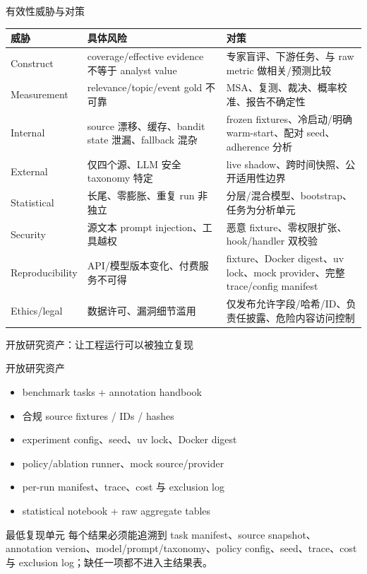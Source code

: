 \begin{frame}{有效性威胁与对策}
\scriptsize
\begin{tabularx}{\textwidth}{p{} X X}
\toprule
威胁 & 具体风险 & 对策 \\
\midrule
Construct & coverage/effective evidence 不等于 analyst value & 专家盲评、下游任务、与 raw metric 做相关/预测比较 \\
Measurement & relevance/topic/event gold 不可靠 & MSA、复测、裁决、概率校准、报告不确定性 \\
Internal & source 漂移、缓存、bandit state 泄漏、fallback 混杂 & frozen fixtures、冷启动/明确 warm-start、配对 seed、adherence 分析 \\
External & 仅四个源、LLM 安全 taxonomy 特定 & live shadow、跨时间快照、公开适用性边界 \\
Statistical & 长尾、零膨胀、重复 run 非独立 & 分层/混合模型、bootstrap、任务为分析单元 \\
Security & 源文本 prompt injection、工具越权 & 恶意 fixture、零权限扩张、hook/handler 双校验 \\
Reproducibility & API/模型版本变化、付费服务不可得 & fixture、Docker digest、uv lock、mock provider、完整 trace/config manifest \\
Ethics/legal & 数据许可、漏洞细节滥用 & 仅发布允许字段/哈希/ID、负责任披露、危险内容访问控制 \\
\bottomrule
\end{tabularx}
\end{frame}

\begin{frame}{开放研究资产：让工程运行可以被独立复现}
\small
\begin{block}{开放研究资产}
\begin{itemize}
  \item benchmark tasks + annotation handbook
  \item 合规 source fixtures / IDs / hashes
  \item experiment config、seed、uv lock、Docker digest
  \item policy/ablation runner、mock source/provider
  \item per-run manifest、trace、cost 与 exclusion log
  \item statistical notebook + raw aggregate tables
\end{itemize}
\end{block}

\begin{alertblock}{最低复现单元}
每个结果必须能追溯到 task manifest、source snapshot、annotation version、model/prompt/taxonomy、policy config、seed、trace、cost 与 exclusion log；缺任一项都不进入主结果表。
\end{alertblock}
\end{frame}

